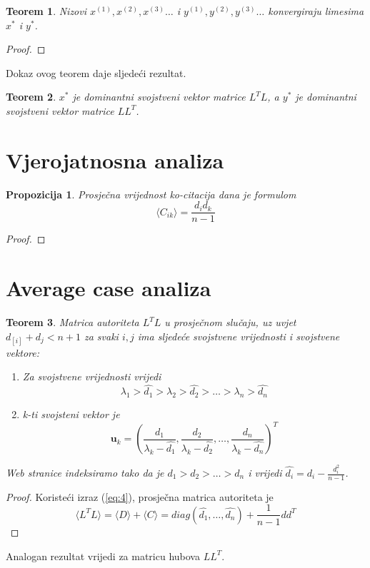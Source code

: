 \documentclass[11pt]{article}
\newtheorem{theorem}{Teorem}[section]
\newtheorem{prop}{Propozicija} [section]
\begin{document}
\begin{theorem}
Nizovi $x^{(1)}, x^{(2)}, x^{(3)}\dots$ i $y^{(1)}, y^{(2)}, y^{(3)}\dots$ konvergiraju limesima $x^{*}$ i $y^{*}$.
\end{theorem}
\begin{proof}

\end{proof}

Dokaz ovog teorem daje sljedeći rezultat.
\begin{theorem}
$x^{*}$ je dominantni svojstveni vektor matrice $L^{T}L$, a $y^{*}$ je dominantni svojstveni vektor matrice $LL^{T}$.
\end{theorem}

\section{Vjerojatnosna analiza}
\begin{prop}
Prosječna vrijednost ko-citacija dana je formulom
\begin{equation} \label{eq:4}
\langle C_{ik}\rangle = \frac{d_{i}d_{k}}{n-1}
\end{equation}
\end{prop}
\begin{proof}

\end{proof}

\section{Average case analiza}
\begin{theorem}
Matrica autoriteta $L^{T}L$ u prosječnom slučaju, uz uvjet $d_[i]+d_{j}<n+1$ za svaki $i,j$ ima sljedeće svojstvene vrijednosti i svojstvene vektore:
\begin{enumerate}
\item Za svojstvene vrijednosti vrijedi
\begin{equation}
\lambda_{1} > \hat{d_{1}}>\lambda_{2}>\hat{d_{2}}>\dots >\lambda_{n}>\hat{d_{n}}
\end{equation}
\item k-ti svojsteni vektor je
\begin{equation} 
\textbf{u}_{k}= \left(\frac{d_{1}}{\lambda_{k}-\hat{d_{1}}},\frac{d_{2}}{\lambda_{k}-\hat{d_{2}}},\dots, \frac{d_{n}}{\lambda_{k}-\hat{d_{n}}} \right)^{T}
\end{equation}
\end{enumerate}
Web stranice indeksiramo tako da je $d_{1}>d_{2}>\dots>d_{n}$ i vrijedi $\hat{d_{i}} = d_{i} - \frac{d_{i}^{2}}{n-1}$.
\end{theorem}
\begin{proof}
Koristeći izraz (\ref{eq:4}), prosječna matrica autoriteta je
\begin{equation}
\langle L^{T}L\rangle = \langle D \rangle + \langle C \rangle = diag(\hat{d_{1}}, \dots , \hat{d_{n}}) + \frac{1}{n-1} dd^{T}
\end{equation}
\end{proof}
Analogan rezultat vrijedi za matricu hubova $LL^{T}$.
\end{document}

